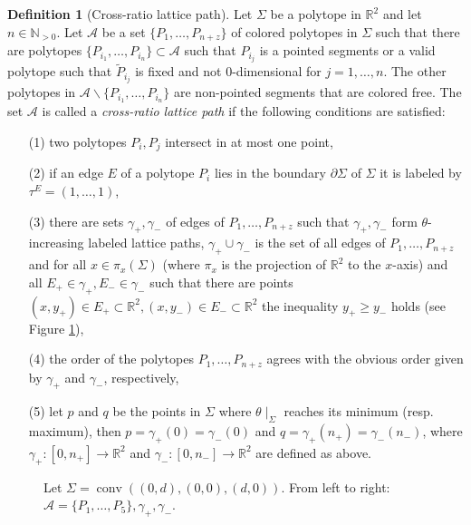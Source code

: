 \documentclass[11pt,reqno,a4]{amsart}
\theoremstyle{dotless}
\theoremstyle{definition}
\newtheorem{definition}[corollary]{Definition}
\begin{document}
\begin{definition}[Cross-ratio lattice path]\label{definition:rag-rug}
Let $\Sigma$ be a polytope in $\mathbb{R}^2$ and let $n\in\mathbb{N}_{>0}$. Let $\mathcal{A}$ be a set $\lbrace P_1,\dots,P_{n+z} \rbrace$ of colored polytopes in $\Sigma$ such that there are polytopes $\lbrace P_{i_1},\dots,P_{i_n}\rbrace\subset\mathcal{A}$ such that $P_{i_j}$ is a pointed segments or a valid polytope such that $\tilde{P}_{i_j}$ is fixed and not $0$-dimensional for $j=1,\dots,n$. The other polytopes in $\mathcal{A}\backslash\lbrace P_{i_1},\dots,P_{i_n}\rbrace$ are non-pointed segments that are colored free. The set $\mathcal{A}$ is called a \textit{cross-ratio lattice path} if the following conditions are satisfied:
\begin{itemize}
\item[(1)]
two polytopes $P_i,P_j$ intersect in at most one point,
\item[(2)]
if an edge $E$ of a polytope $P_i$ lies in the boundary $\partial\Sigma$ of $\Sigma$ it is labeled by $\tau^E=\left( 1,\dots, 1\right)$,
\item[(3)]
 there are sets $\gamma_+,\gamma_-$ of edges of $P_1,\dots,P_{n+z}$ such that $\gamma_+,\gamma_-$ form $\theta$-increasing labeled lattice paths, $\gamma_+\cup\gamma_-$ is the set of all edges of $P_1,\dots,P_{n+z}$ and for all $x\in\pi_x\left( \Sigma\right)$ (where $\pi_x$ is the projection of $\mathbb{R}^2$ to the $x$-axis) and  all $E_+\in\gamma_+,E_-\in\gamma_-$ such that there are points $\left(x,y_+ \right)\in E_+  \subset\mathbb{R}^2,\left(x,y_- \right)\in E_-  \subset\mathbb{R}^2$ the inequality $y_+\geq y_-$ holds (see Figure \ref{Example_upper_and_lower_path}),
\item[(4)]
the order of the polytopes $P_1,\dots,P_{n+z}$ agrees with the obvious order given by $\gamma_+$ and $\gamma_-$, respectively,
\item[(5)]
let $p$ and $q$ be the points in $\Sigma$ where $\theta\mid_\Sigma$ reaches its minimum (resp. maximum), then $p=\gamma_+(0)=\gamma_-(0)$ and $q=\gamma_+(n_+)=\gamma_-(n_-)$, where $\gamma_+:\left[ 0,n_+\right]\to\mathbb{R}^2$ and $\gamma_-:\left[ 0,n_-\right]\to\mathbb{R}^2$ are defined as above.
\end{itemize}
\end{definition}


\begin{figure}[H]
\centering
\def\svgwidth{400pt}

\caption{ Let $\Sigma=\operatorname{conv}\left((0,d),(0,0),(d,0) \right)$. From left to right: $\mathcal{A}=\lbrace P_1,\dots,P_5\rbrace, \gamma_+, \gamma_-$.}
\label{Example_upper_and_lower_path}
\end{figure}
\end{document}

